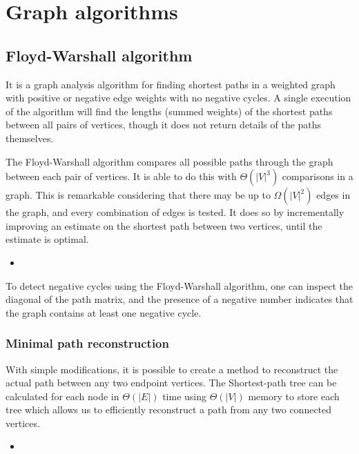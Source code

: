 \documentclass[a4paper, twoside,openany]{book}
\newcommand{\insertcode}[2]{\begin{itemize}\item[]\end{itemize}} %
\begin{document}
\tableofcontents

\chapter{Graph algorithms}
\section{Floyd-Warshall algorithm}
It is a graph analysis algorithm for finding shortest paths in a weighted graph with positive or negative edge weights with no negative cycles.
A single execution of the algorithm will find the lengths (summed weights) of the shortest paths between all pairs of vertices, though it does not return details of the paths themselves.

The Floyd-Warshall algorithm compares all possible paths through the graph between each pair of vertices.
It is able to do this with $\Theta(|V|^3)$ comparisons in a graph. 
This is remarkable considering that there may be up to $\Omega(|V|^2)$ edges in the graph, and every combination of edges is tested. 
It does so by incrementally improving an estimate on the shortest path between two vertices, until the estimate is optimal. 

\insertcode{"codes/floyd_warshall.cpp"}{A C++ code for the Floyd-Warshall algorithm} %

To detect negative cycles using the Floyd-Warshall algorithm, one can inspect the diagonal of the path matrix, and the presence of a negative number indicates that the graph contains at least one negative cycle.

\subsection{Minimal path reconstruction} 
With simple modifications, it is possible to create a method to reconstruct the actual path between any two endpoint vertices. 
The Shortest-path tree can be calculated for each node in $\Theta(|E|)$ time using $\Theta(|V|)$ memory to store each tree which allows us to efficiently reconstruct a path from any two connected vertices.

\insertcode{"codes/floyd_warshall_reconstruct.cpp"}{A C++ code for the Floyd-Warshall algorithm with information about the minimal path.} 
\end{document}
